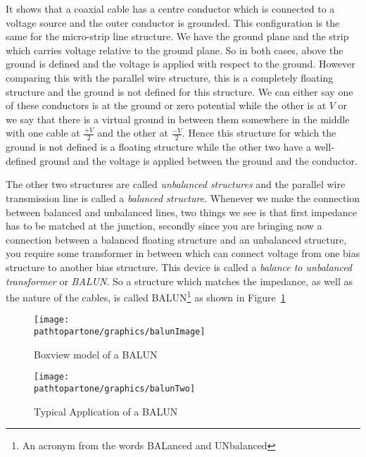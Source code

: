 It shows that a coaxial cable has a centre conductor which is connected to a voltage source and the outer conductor is grounded. This configuration is the same for the micro-strip line structure. We have the ground plane and the strip which carries voltage relative to the ground plane. So in both cases, above the ground is defined and the voltage is applied with respect to the ground. However comparing this with the parallel wire structure, this is a completely floating structure and the ground is not defined for this structure. We can either say one of these conductors is at the ground or zero potential while the other is at $V$ or we say that there is a virtual ground in between them somewhere in the middle with one cable at $\frac{+V}{2}$ and the other at $\frac{-V}{2}$. Hence this structure for which the ground is not defined is a floating structure while the other two have a well-defined ground and the voltage is applied between the ground and the conductor.

The other two structures are called \emph{unbalanced structures} and the parallel wire transmission line is called a \emph{balanced structure}. Whenever we make the connection between balanced and unbalanced lines, two things we see is that first impedance has to be matched at the junction, secondly since you are bringing now a connection between a balanced floating structure and an unbalanced structure, you require some transformer in between which can connect voltage from one bias structure to another bias structure. This device is called a \emph{balance to unbalanced transformer} or \emph{BALUN}. So a structure which matches the impedance, as well as the nature of the cables, is called BALUN\footnote{
An acronym from the words BALanced and UNbalanced
} as shown in Figure~\ref{fig:balunImage}
\begin{figure}[h]
\centering
\texttt{[image: \\pathtopartone/graphics/balunImage]}
\caption{Boxview model of a BALUN}
\label{fig:balunImage}
\end{figure}
\begin{figure}[h]
\centering
\texttt{[image: \\pathtopartone/graphics/balunTwo]}
\caption{Typical Application of a BALUN}
\label{fig:balunTwo}
\end{figure}

